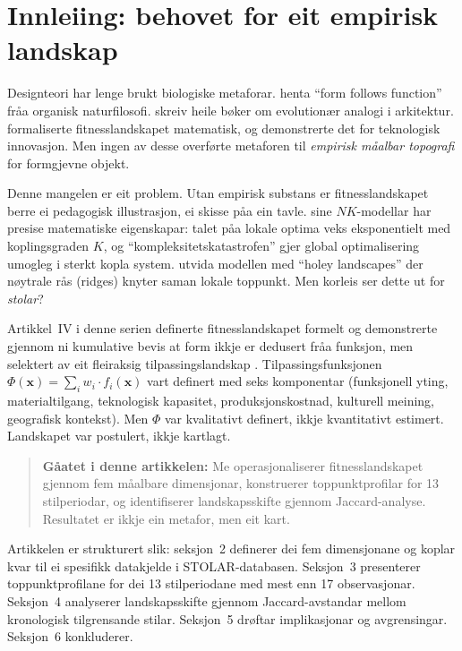 \documentclass[10pt, a4paper, twocolumn]{article}
\begin{document}
\section{Innleiing: behovet for eit empirisk landskap}

Designteori har lenge brukt biologiske metaforar. \citet{sullivan1896} henta ``form follows function'' fr\r{a}a organisk naturfilosofi. \citet{steadman2008} skreiv heile b\o ker om evolution\ae r analogi i arkitektur. \citet{kauffman1993} formaliserte fitnesslandskapet matematisk, og \citet{frenken2006} demonstrerte det for teknologisk innovasjon. Men ingen av desse overf\o rte metaforen til \emph{empirisk m\r{a}albar topografi} for formgjevne objekt.

Denne mangelen er eit problem. Utan empirisk substans er fitnesslandskapet berre ei pedagogisk illustrasjon, ei skisse p\r{a}a ein tavle. \citet{kauffman1993} sine $NK$-modellar har presise matematiske eigenskapar: talet p\r{a}a lokale optima veks eksponentielt med koplingsgraden $K$, og ``kompleksitetskatastrofen'' gjer global optimalisering umogleg i sterkt kopla system. \citet{gavrilets2004} utvida modellen med ``holey landscapes'' der n\o ytrale r\aa s (ridges) knyter saman lokale toppunkt. Men korleis ser dette ut for \emph{stolar}?

Artikkel~IV i denne serien definerte fitnesslandskapet formelt og demonstrerte gjennom ni kumulative bevis at form ikkje er dedusert fr\r{a}a funksjon, men selektert av eit fleiraksig tilpassingslandskap \citep{finne2026}. Tilpassingsfunksjonen $\Phi(\mathbf{x}) = \sum_i w_i \cdot f_i(\mathbf{x})$ vart definert med seks komponentar (funksjonell yting, materialtilgang, teknologisk kapasitet, produksjonskostnad, kulturell meining, geografisk kontekst). Men $\Phi$ var kvalitativt definert, ikkje kvantitativt estimert. Landskapet var postulert, ikkje kartlagt.

\begin{quote}
\textbf{G\r{a}atet i denne artikkelen:} Me operasjonaliserer fitnesslandskapet gjennom fem m\r{a}albare dimensjonar, konstruerer toppunktprofilar for 13 stilperiodar, og identifiserer landskapsskifte gjennom Jaccard-analyse. Resultatet er ikkje ein metafor, men eit kart.
\end{quote}

Artikkelen er strukturert slik: seksjon~2 definerer dei fem dimensjonane og koplar kvar til ei spesifikk datakjelde i STOLAR-databasen. Seksjon~3 presenterer toppunktprofilane for dei 13 stilperiodane med mest enn 17 observasjonar. Seksjon~4 analyserer landskapsskifte gjennom Jaccard-avstandar mellom kronologisk tilgrensande stilar. Seksjon~5 dr\o ftar implikasjonar og avgrensingar. Seksjon~6 konkluderer.
\end{document}
